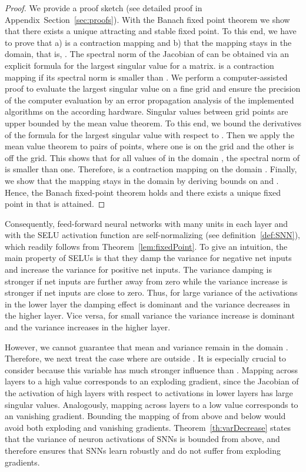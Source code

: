 \documentclass{article}
\begin{document}
\begin{proof} 
We provide a proof sketch (see detailed proof in Appendix~Section~\ref{sec:proofs}).
With the Banach fixed point theorem we show that there exists
a unique attracting and stable fixed point. 
To this end, we have to prove that  a)  is a contraction mapping and b) that 
the mapping stays in the domain, that is, . 
The spectral norm of the Jacobian of  can be obtained via 
an explicit formula for the largest singular value for a  matrix. 
 is a contraction mapping if its spectral norm is smaller than .
We perform a computer-assisted proof to 
evaluate the largest singular value on a fine
grid and ensure the precision of the computer 
evaluation by an error propagation analysis of the implemented
algorithms on the according hardware.
Singular values between grid points are upper bounded by the 
mean value theorem. To this end, we bound the derivatives
of the formula for the largest singular value with respect to
. 
Then we apply the mean value theorem to pairs of points, where one is on the grid and the
other is off the grid. This shows that for all values of
 in  the domain , the spectral norm of
 is smaller than one. 
Therefore,  is a contraction mapping on the domain .
Finally, we show that the mapping  stays in the domain  by
deriving bounds on  and .
Hence, the Banach fixed-point theorem holds and there exists a unique
fixed point in  that is attained.
\end{proof}

Consequently, feed-forward neural networks with many units in each layer 
and with the SELU activation function are self-normalizing (see definition~\ref{def:SNN}), which 
readily follows from Theorem~\ref{lem:fixedPoint}.
To give an intuition, the main property of SELUs is that they damp the variance for negative
net inputs and increase the variance for positive net inputs. 
The variance damping is stronger if net inputs are further away from zero while
the variance increase is stronger if net inputs are close to zero.
Thus, for large variance of the activations in the lower
layer the damping effect is dominant and the variance decreases in the
higher layer.
Vice versa, for small variance the 
variance increase is dominant and the variance increases in the higher layer.

However, we cannot guarantee that mean and variance remain in the domain .
Therefore, we next treat the case where  are outside .
It is especially crucial to consider  because this variable has much stronger 
influence than . Mapping  across layers to a high value corresponds to an 
exploding gradient, since the  Jacobian of the activation of high layers with respect to activations
in lower layers has large singular values. 
Analogously, mapping  across layers to a low value corresponds to an 
vanishing gradient. Bounding the mapping of  from above and below would avoid 
both exploding and vanishing gradients.
Theorem~\ref{th:varDecrease} states that the variance of neuron activations of SNNs
is bounded from above, and therefore ensures that SNNs learn robustly and do not  
suffer from exploding gradients.
\end{document}
